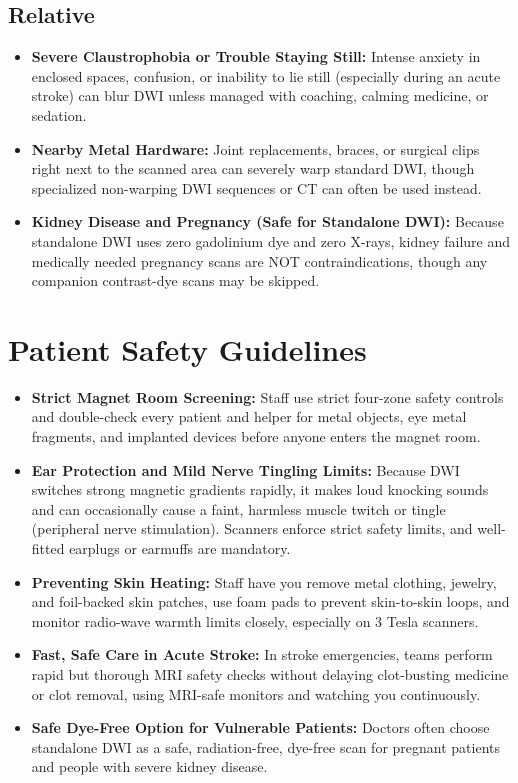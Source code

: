 \subsection{Relative}
\begin{itemize}
\item \textbf{Severe Claustrophobia or Trouble Staying Still:} Intense anxiety in enclosed spaces, confusion, or inability to lie still (especially during an acute stroke) can blur DWI unless managed with coaching, calming medicine, or sedation.
\item \textbf{Nearby Metal Hardware:} Joint replacements, braces, or surgical clips right next to the scanned area can severely warp standard DWI, though specialized non-warping DWI sequences or CT can often be used instead.
\item \textbf{Kidney Disease and Pregnancy (Safe for Standalone DWI):} Because standalone DWI uses zero gadolinium dye and zero X-rays, kidney failure and medically needed pregnancy scans are NOT contraindications, though any companion contrast-dye scans may be skipped.
\end{itemize}

\section{Patient Safety Guidelines}
\begin{itemize}
\item \textbf{Strict Magnet Room Screening:} Staff use strict four-zone safety controls and double-check every patient and helper for metal objects, eye metal fragments, and implanted devices before anyone enters the magnet room.
\item \textbf{Ear Protection and Mild Nerve Tingling Limits:} Because DWI switches strong magnetic gradients rapidly, it makes loud knocking sounds and can occasionally cause a faint, harmless muscle twitch or tingle (peripheral nerve stimulation). Scanners enforce strict safety limits, and well-fitted earplugs or earmuffs are mandatory.
\item \textbf{Preventing Skin Heating:} Staff have you remove metal clothing, jewelry, and foil-backed skin patches, use foam pads to prevent skin-to-skin loops, and monitor radio-wave warmth limits closely, especially on 3 Tesla scanners.
\item \textbf{Fast, Safe Care in Acute Stroke:} In stroke emergencies, teams perform rapid but thorough MRI safety checks without delaying clot-busting medicine or clot removal, using MRI-safe monitors and watching you continuously.
\item \textbf{Safe Dye-Free Option for Vulnerable Patients:} Doctors often choose standalone DWI as a safe, radiation-free, dye-free scan for pregnant patients and people with severe kidney disease.
\end{itemize}

